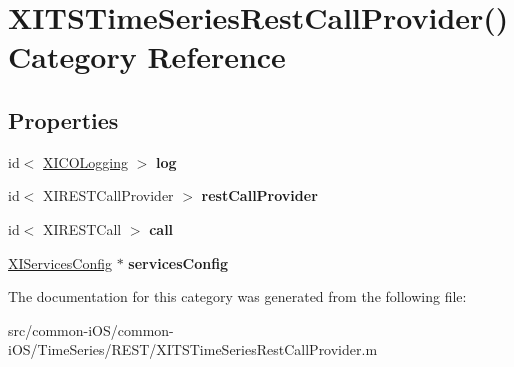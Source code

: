 \hypertarget{category_x_i_t_s_time_series_rest_call_provider_07_08}{}\section{X\+I\+T\+S\+Time\+Series\+Rest\+Call\+Provider() Category Reference}
\label{category_x_i_t_s_time_series_rest_call_provider_07_08}
\subsection*{Properties}
\begin{DoxyCompactItemize}
\item 
\hypertarget{category_x_i_t_s_time_series_rest_call_provider_07_08_a9fc8c3d833490a64db0c2dda69f4aeae}{}\label{category_x_i_t_s_time_series_rest_call_provider_07_08_a9fc8c3d833490a64db0c2dda69f4aeae} 
id$<$ \hyperlink{protocol_x_i_c_o_logging-p}{X\+I\+C\+O\+Logging} $>$ {\bfseries log}
\item 
\hypertarget{category_x_i_t_s_time_series_rest_call_provider_07_08_a64ff56111aff05c8763e5ea6f7bce3be}{}\label{category_x_i_t_s_time_series_rest_call_provider_07_08_a64ff56111aff05c8763e5ea6f7bce3be} 
id$<$ X\+I\+R\+E\+S\+T\+Call\+Provider $>$ {\bfseries rest\+Call\+Provider}
\item 
\hypertarget{category_x_i_t_s_time_series_rest_call_provider_07_08_ab6bd36d6ee6665c5b907f99a3cf93221}{}\label{category_x_i_t_s_time_series_rest_call_provider_07_08_ab6bd36d6ee6665c5b907f99a3cf93221} 
id$<$ X\+I\+R\+E\+S\+T\+Call $>$ {\bfseries call}
\item 
\hypertarget{category_x_i_t_s_time_series_rest_call_provider_07_08_ad6d54a7eefef7744eecc06ef18092587}{}\label{category_x_i_t_s_time_series_rest_call_provider_07_08_ad6d54a7eefef7744eecc06ef18092587} 
\hyperlink{interface_x_i_services_config}{X\+I\+Services\+Config} $\ast$ {\bfseries services\+Config}
\end{DoxyCompactItemize}


The documentation for this category was generated from the following file\+:\begin{DoxyCompactItemize}
\item 
src/common-\/i\+O\+S/common-\/i\+O\+S/\+Time\+Series/\+R\+E\+S\+T/X\+I\+T\+S\+Time\+Series\+Rest\+Call\+Provider.\+m\end{DoxyCompactItemize}

